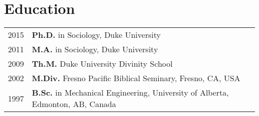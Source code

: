 \section*{Education}
\begin{longtable}{p{} p{}}
2015 & \textbf{Ph.D.} in Sociology, Duke University\\
2011 & \textbf{M.A.} in Sociology, Duke University\\
2009 & \textbf{Th.M.} Duke University Divinity School\\
2002 & \textbf{M.Div.} Fresno Pacific Biblical Seminary, Fresno, CA, USA\\
1997 & \textbf{B.Sc.} in Mechanical Engineering, University of Alberta, Edmonton, AB, Canada \\
\end{longtable}